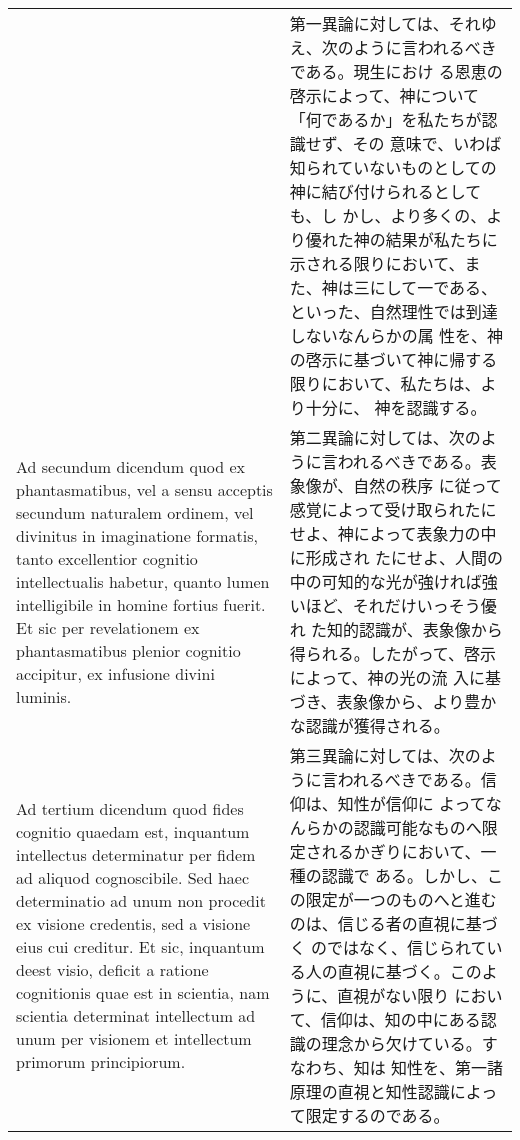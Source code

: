 \documentclass[10pt]{jsarticle} %
\begin{document}
\begin{longtable}{p{21em}p{21em}}
&

第一異論に対しては、それゆえ、次のように言われるべきである。現生におけ
る恩恵の啓示によって、神について「何であるか」を私たちが認識せず、その
意味で、いわば知られていないものとしての神に結び付けられるとしても、し
かし、より多くの、より優れた神の結果が私たちに示される限りにおいて、ま
た、神は三にして一である、といった、自然理性では到達しないなんらかの属
性を、神の啓示に基づいて神に帰する限りにおいて、私たちは、より十分に、
神を認識する。

\\

{\sc Ad secundum dicendum} quod ex phantasmatibus, vel a sensu
acceptis secundum naturalem ordinem, vel divinitus in imaginatione
formatis, tanto excellentior cognitio intellectualis habetur, quanto
lumen intelligibile in homine fortius fuerit. Et sic per revelationem
ex phantasmatibus plenior cognitio accipitur, ex infusione divini
luminis.

&

第二異論に対しては、次のように言われるべきである。表象像が、自然の秩序
に従って感覚によって受け取られたにせよ、神によって表象力の中に形成され
たにせよ、人間の中の可知的な光が強ければ強いほど、それだけいっそう優れ
た知的認識が、表象像から得られる。したがって、啓示によって、神の光の流
入に基づき、表象像から、より豊かな認識が獲得される。

\\

{\sc Ad tertium dicendum} quod fides cognitio quaedam est, inquantum
intellectus determinatur per fidem ad aliquod cognoscibile. Sed haec
determinatio ad unum non procedit ex visione credentis, sed a visione
eius cui creditur. Et sic, inquantum deest visio, deficit a ratione
cognitionis quae est in scientia, nam scientia determinat intellectum
ad unum per visionem et intellectum primorum principiorum.

&

第三異論に対しては、次のように言われるべきである。信仰は、知性が信仰に
よってなんらかの認識可能なものへ限定されるかぎりにおいて、一種の認識で
ある。しかし、この限定が一つのものへと進むのは、信じる者の直視に基づく
のではなく、信じられている人の直視に基づく。このように、直視がない限り
において、信仰は、知の中にある認識の理念から欠けている。すなわち、知は
知性を、第一諸原理の直視と知性認識によって限定するのである。

\end{longtable}
\end{document}
